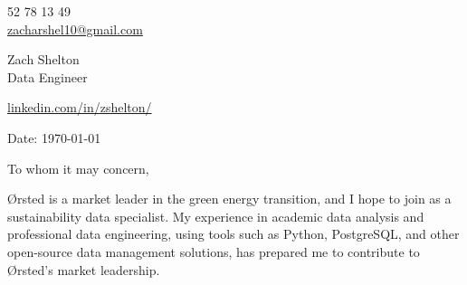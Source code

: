 \documentclass[11pt,a4]{article}
\begin{document}
\begin{center}
    \begin{minipage}[b]{0.24\textwidth}
            \large 52 78 13 49 \\
            \large \href{mailto:zshelton1997@gmail.com}{zacharshel10@gmail.com} 
    \end{minipage}%
    \begin{minipage}[b]{0.5\textwidth}
            \centering
            {\Huge Zach Shelton} \\ %
            \vspace{0.1cm}
            {\color{UI_blue} \Large{Data Engineer}} \\
    \end{minipage}%
    \begin{minipage}[b]{0.24\textwidth}
            \flushright \large
            {\href{https://www.linkedin.com/in/zshelton/}{linkedin.com/in/zshelton/} } \\

    \end{minipage}   
    
\vspace{-0.15cm} 
{\color{UI_blue} \hrulefill}
\end{center}

\justify
\setlength{\parindent}{0pt}
\setlength{\parskip}{12pt}
\vspace{0.1cm}


Date: \today \par \vspace{-0.1cm}

To whom it may concern,

Ørsted is a market leader in the green energy transition, and I hope to join as a sustainability data specialist. My experience in academic data analysis and professional data engineering, using tools such as Python, PostgreSQL, and other open-source data management solutions, has prepared me to contribute to Ørsted's market leadership.
\end{document}
